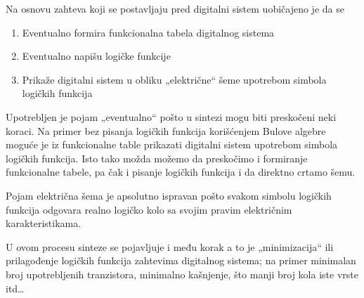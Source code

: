 \begin{frame}[label=02-s010]
\gusttekst
Na osnovu zahteva koji se postavljaju pred digitalni sistem uobičajeno je da se
\begin{enumerate}
\item Eventualno formira funkcionalna tabela digitalnog sistema
\item Eventualno napišu logičke funkcije
\item Prikaže digitalni sistem u obliku „električne“ šeme upotrebom simbola logičkih funkcija
\end{enumerate}
Upotrebljen je pojam „eventualno“ pošto u sintezi mogu biti preskočeni neki koraci. Na primer bez pisanja logičkih funkcija korišćenjem Bulove algebre moguće je iz funkcionalne table prikazati digitalni sistem upotrebom simbola logičkih funkcija. Isto tako možda možemo da preskočimo i formiranje funkcionalne tabele, pa čak i pisanje logičkih funkcija i da direktno crtamo šemu.

Pojam električna šema je apsolutno ispravan pošto svakom simbolu logičkih funkcija odgovara realno logičko kolo sa svojim pravim električnim karakteristikama.

U ovom procesu sinteze se pojavljuje i među korak a to je „minimizacija“ ili prilagođenje logičkih funkcija zahtevima digitalnog sistema; na primer minimalan broj upotrebljenih tranzistora, minimalno kašnjenje, što manji broj kola iste vrste itd\ldots
\end{frame}
